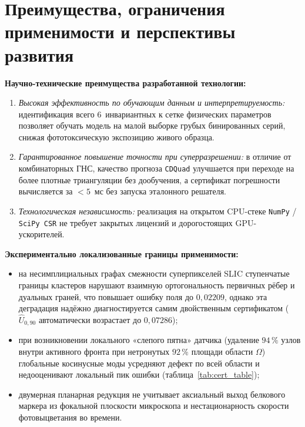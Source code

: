 \section{Преимущества, ограничения применимости и перспективы развития}

\textbf{Научно-технические преимущества разработанной технологии:}
\begin{enumerate}
    \item \emph{Высокая эффективность по обучающим данным и интерпретируемость:} идентификация всего $6$~инвариантных к сетке физических параметров позволяет обучать модель на малой выборке грубых бинированных серий, снижая фототоксическую экспозицию живого образца.
    \item \emph{Гарантированное повышение точности при суперразрешении:} в отличие от комбинаторных ГНС, качество прогноза \texttt{CDQuad} улучшается при переходе на более плотные триангуляции без дообучения, а сертификат погрешности вычисляется за $<5$~мс без запуска эталонного решателя.
    \item \emph{Технологическая независимость:} реализация на открытом CPU-стеке \texttt{NumPy} / \texttt{SciPy CSR} не требует закрытых лицензий и дорогостоящих GPU-ускорителей.
\end{enumerate}

\textbf{Экспериментально локализованные границы применимости:}
\begin{itemize}
    \item на несимплициальных графах смежности суперпикселей SLIC ступенчатые границы кластеров нарушают взаимную ортогональность первичных рёбер и дуальных граней, что повышает ошибку поля до $0{,}02209$, однако эта деградация надёжно диагностируется самим двойственным сертификатом ($\widehat{U}_{0{,}90}$ автоматически возрастает до $0{,}07286$);
    \item при возникновении локального «слепого пятна» датчика (удаление $94\,\%$ узлов внутри активного фронта при нетронутых $92\,\%$ площади области $\Omega$) глобальные косинусные моды усредняют дефект по всей области и недооценивают локальный пик ошибки (таблица~\ref{tab:cert_table});
    \item двумерная планарная редукция не учитывает аксиальный выход белкового маркера из фокальной плоскости микроскопа и нестационарность скорости фотовыцветания во времени.
\end{itemize}


